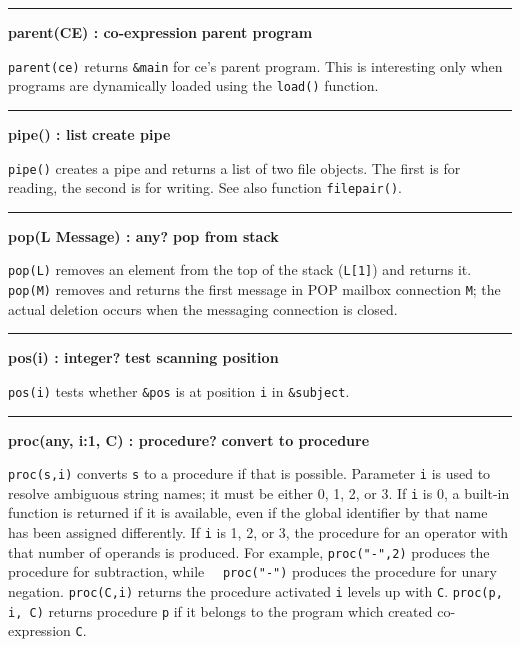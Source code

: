 \bigskip\hrule\vspace{0.1cm}
\noindent
{\bf parent(CE) : co{}-expression } \hfill {\bf parent program}

\noindent
\texttt{parent(ce)} returns \texttt{\&main} for ce's
parent program. This is interesting only when programs are dynamically
loaded using the \texttt{load()} function.

\bigskip\hrule\vspace{0.1cm}
\noindent
{\bf pipe() : list } \hfill {\bf create pipe}

\noindent
{}\texttt{pipe()} creates a pipe and returns a list of two
file objects. The first is for reading, the second is for writing. See
also function \texttt{filepair()}.

\bigskip\hrule\vspace{0.1cm}
\noindent
{\bf pop(L {\textbar} Message) : any? } \hfill {\bf pop from stack}\WarningNotThreadSafe

\noindent
{}\texttt{pop(L)} removes an element from the top of the
stack (\texttt{L[1]}) and returns it. \texttt{pop(M)}
removes and returns the first message in POP mailbox connection \texttt{M};
the actual deletion occurs when the messaging connection is closed.

\bigskip\hrule\vspace{0.1cm}
\noindent
{\bf pos(i) : integer? } \hfill {\bf test scanning position}

\noindent
{}\texttt{pos(i)} tests whether \texttt{\&pos} is at
position \texttt{i} in \texttt{\&subject}.

\bigskip\hrule\vspace{0.1cm}
\noindent
{\bf proc(any, i:1, C) : procedure? } \hfill {\bf convert to procedure}

\noindent
{}\texttt{proc(s,i)} converts \texttt{s} to a procedure
if that is possible. Parameter \texttt{i} is used to resolve ambiguous
string names; it must be either 0, 1, 2, or 3. If \texttt{i} is 0, a
built-in function is returned if it is available, even if the global
identifier by that name has been assigned differently. If \texttt{i} is
1, 2, or 3, the procedure for an operator with that number of operands
is produced. For example,
\texttt{proc("-",2)} produces the procedure
for subtraction, while
\ \ \texttt{proc("-")} produces the
procedure for unary negation. \texttt{proc(C,i)} returns the procedure
activated \texttt{i} levels up with \texttt{C}. \texttt{proc(p, i, C)}
returns procedure \texttt{p} if it belongs to the program which created
co-expression \texttt{C}.

